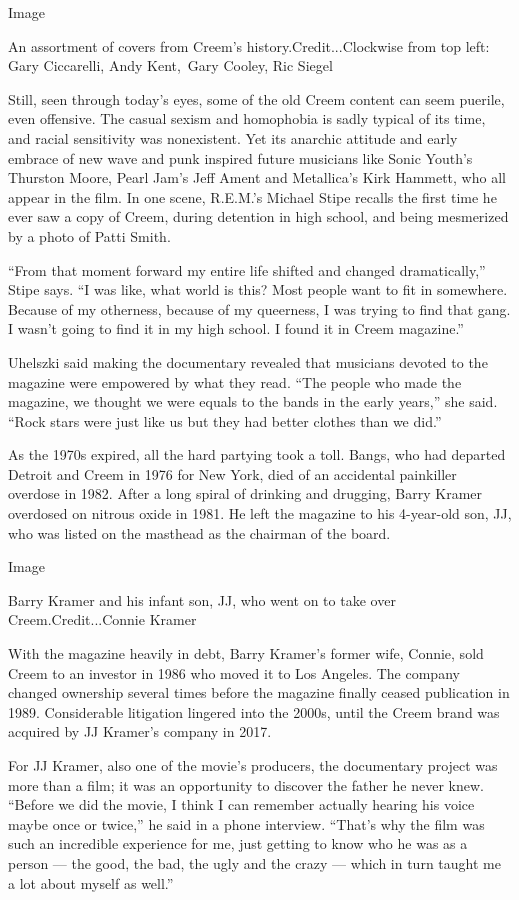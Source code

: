 Image

An assortment of covers from Creem's history.Credit...Clockwise from top
left: Gary Ciccarelli, Andy Kent,~Gary Cooley, Ric Siegel

Still, seen through today's eyes, some of the old Creem content can seem
puerile, even offensive. The casual sexism and homophobia is sadly
typical of its time, and racial sensitivity was nonexistent. Yet its
anarchic attitude and early embrace of new wave and punk inspired future
musicians like Sonic Youth's Thurston Moore, Pearl Jam's Jeff Ament and
Metallica's Kirk Hammett, who all appear in the film. In one scene,
R.E.M.'s Michael Stipe recalls the first time he ever saw a copy of
Creem, during detention in high school, and being mesmerized by a photo
of Patti Smith.

``From that moment forward my entire life shifted and changed
dramatically,'' Stipe says. ``I was like, what world is this? Most
people want to fit in somewhere. Because of my otherness, because of my
queerness, I was trying to find that gang. I wasn't going to find it in
my high school. I found it in Creem magazine.''

Uhelszki said making the documentary revealed that musicians devoted to
the magazine were empowered by what they read. ``The people who made the
magazine, we thought we were equals to the bands in the early years,''
she said. ``Rock stars were just like us but they had better clothes
than we did.''

As the 1970s expired, all the hard partying took a toll. Bangs, who had
departed Detroit and Creem in 1976 for New York, died of an accidental
painkiller overdose in 1982. After a long spiral of drinking and
drugging, Barry Kramer overdosed on nitrous oxide in 1981. He left the
magazine to his 4-year-old son, JJ, who was listed on the masthead as
the chairman of the board.

Image

Barry Kramer and his infant son, JJ, who went on to take over
Creem.Credit...Connie Kramer

With the magazine heavily in debt, Barry Kramer's former wife, Connie,
sold Creem to an investor in 1986 who moved it to Los Angeles. The
company changed ownership several times before the magazine finally
ceased publication in 1989. Considerable litigation lingered into the
2000s, until the Creem brand was acquired by JJ Kramer's company in
2017.

For JJ Kramer, also one of the movie's producers, the documentary
project was more than a film; it was an opportunity to discover the
father he never knew. ``Before we did the movie, I think I can remember
actually hearing his voice maybe once or twice,'' he said in a phone
interview. ``That's why the film was such an incredible experience for
me, just getting to know who he was as a person --- the good, the bad,
the ugly and the crazy --- which in turn taught me a lot about myself as
well.''

